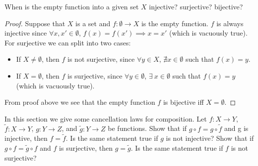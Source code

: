 \begin{exercise}\label{ex 3.3.3}
    When is the empty function into a given set \(X\) injective?
    surjective?
    bijective?
\end{exercise}

\begin{proof}
    Suppose that \(X\) is a set and \(f : \emptyset \to X\) is the empty function.
    \(f\) is always injective since \(\forall x, x' \in \emptyset\), \(f(x) = f(x') \implies x = x'\) (which is vacuously true).
    For surjective we can split into two cases:
    \begin{itemize}
        \item If \(X \neq \emptyset\), then \(f\) is not surjective, since \(\forall y \in X\), \(\nexists x \in \emptyset\) such that \(f(x) = y\).
        \item If \(X = \emptyset\), then \(f\) is surjective, since \(\forall y \in \emptyset\), \(\exists\ x \in \emptyset\) such that \(f(x) = y\) (which is vacuously true).
    \end{itemize}
    From proof above we see that the empty function \(f\) is bijective iff \(X = \emptyset\).
\end{proof}

\begin{exercise}\label{ex 3.3.4}
    In this section we give some cancellation laws for composition.
    Let \(f : X \to Y\), \(\tilde{f} : X \to Y\), \(g : Y \to Z\), and \(\tilde{g} : Y \to Z\) be functions.
    Show that if \(g \circ f = g \circ \tilde{f}\) and g is injective, then \(f = \tilde{f}\).
    Is the same statement true if \(g\) is not injective?
    Show that if \(g \circ f = \tilde{g} \circ f\) and \(f\) is surjective, then \(g = \tilde{g}\).
    Is the same statement true if \(f\) is not surjective?
\end{exercise}

